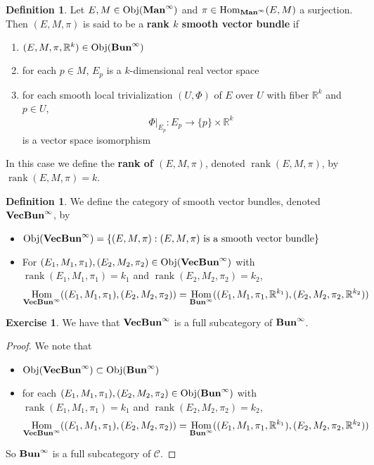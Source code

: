 \documentclass{book}
\theoremstyle{definition}
\newtheorem{defn}[definition]{Definition}
\newtheorem{ex}[definition]{Exercise}
\newcommand{\R}{\mathbb{R}}
\newcommand{\MC}{\mathcal{C}}
\DeclareMathOperator{\Obj}{Obj}
\DeclareMathOperator{\Hom}{Hom}
\DeclareMathOperator{\rnk}{rank}
\DeclareMathOperator*{\Maninf}{\text{\tbf{Man}}^{\infty}}
\DeclareMathOperator*{\Buninf}{\text{\tbf{Bun}}^{\infty}}
\DeclareMathOperator*{\VecBuninf}{\text{\tbf{VecBun}}^{\infty}}
\DeclareMathOperator*{\0}{\mbf{0}}
\DeclareMathOperator*{\1}{\mbf{1}}
\newcommand{\tbf}[1]{\textbf{#1}}
\begin{document}
	\begin{defn}
		Let $E,M \in \Obj(\Maninf)$ and $\pi \in \Hom_{\Maninf}(E, M)$ a surjection. Then $(E, M, \pi)$ is said to be a \tbf{rank $k$ smooth vector bundle} if 
		\begin{enumerate}
			\item $(E, M, \pi, \R^k) \in \Obj(\Buninf)$
			\item for each $p \in M$, $E_p$ is a $k$-dimensional real vector space
			\item for each smooth local trivialization $(U, \Phi)$ of $E$ over $U$ with fiber $\R^k$ and $p \in U$, $$\Phi|_{E_p}: E_p \rightarrow \{p\} \times \R^k$$ is a vector space isomorphism
		\end{enumerate}
		In this case we define the \tbf{rank of $(E, M, \pi)$}, denoted $\rnk (E, M, \pi)$, by $ \rnk (E, M, \pi) = k$.
	\end{defn}

\begin{defn}
	We define the category of smooth vector bundles, denoted $\VecBuninf$, by 
	\begin{itemize}
		\item $\Obj(\VecBuninf) = \{(E, M, \pi): (E, M, \pi) \text{ is a smooth vector bundle}\}$
		\item For $(E_1, M_1, \pi_1), (E_2, M_2, \pi_2) \in \Obj(\VecBuninf)$ with $\rnk (E_1, M_1, \pi_1) = k_1$ and $\rnk (E_2, M_2, \pi_2) = k_2$,  
		$$\Hom_{\VecBuninf}((E_1, M_1, \pi_1), (E_2, M_2, \pi_2)) = \Hom_{\Buninf}((E_1, M_1, \pi_1, \R^{k_1}), (E_2, M_2, \pi_2, \R^{k_2}))$$
	\end{itemize}
\end{defn}

\begin{ex}
	We have that $\VecBuninf$ is a full subcategory of $\Buninf$.
\end{ex}

\begin{proof} We note that 
	\begin{itemize}
		\item $\Obj(\VecBuninf) \subset \Obj(\Buninf)$
		\item for each $(E_1, M_1, \pi_1), (E_2, M_2, \pi_2) \in \Obj(\Buninf)$ with $\rnk (E_1, M_1, \pi_1) = k_1$ and $\rnk (E_2, M_2, \pi_2) = k_2$, 
		$$\Hom_{\VecBuninf}((E_1, M_1, \pi_1), (E_2, M_2, \pi_2)) = \Hom_{\Buninf}((E_1, M_1, \pi_1, \R^{k_1}), (E_2, M_2, \pi_2, \R^{k_2}))$$
	\end{itemize}
	So $\Buninf$ is a full subcategory of $\MC$.
\end{proof}
\end{document}
